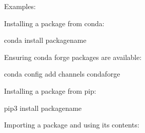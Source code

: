 \documentclass[letterpaper,10pt,english]{sphinxmanual}
\begin{document}
Examples:

\begin{sphinxVerbatim}[commandchars=\\\{\}]
  
             
               
  \PYG{p}{[}    \PYG{p}{]}
    
\end{sphinxVerbatim}

Installing a package from conda:

\begin{sphinxVerbatim}[commandchars=\\\{\}]
conda install package\PYGZus{}name
\end{sphinxVerbatim}

Ensuring conda forge packages are available:

\begin{sphinxVerbatim}[commandchars=\\\{\}]
conda config \PYGZhy{}\PYGZhy{}add channels conda\PYGZhy{}forge
\end{sphinxVerbatim}

Installing a package from pip:

\begin{sphinxVerbatim}[commandchars=\\\{\}]
pip3 install package\PYGZus{}name
\end{sphinxVerbatim}

Importing a package and using its contents:

\begin{sphinxVerbatim}[commandchars=\\\{\}]
 
  
   
  
\end{sphinxVerbatim}
\end{document}
